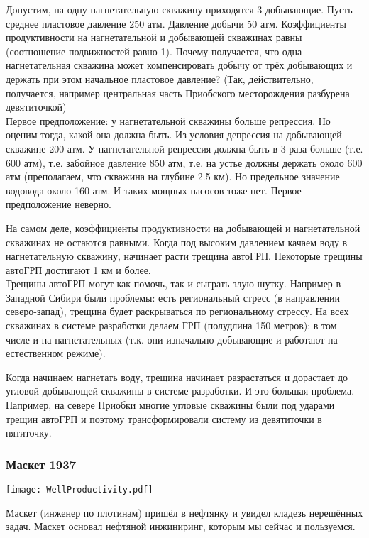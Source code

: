 \documentclass[main.tex]{subfiles}
\begin{document}
Допустим, на одну нагнетательную скважину приходятся 3 добывающие. Пусть среднее пластовое давление 250 атм. Давление добычи 50 атм. Коэффициенты продуктивности на нагнетательной и добывающей скважинах равны (соотношение подвижностей равно 1). Почему получается, что одна нагнетательная скважина может компенсировать добычу от трёх добывающих и держать при этом начальное пластовое давление? (Так, действительно, получается, например центральная часть Приобского месторождения разбурена девятиточкой)\\

Первое предположение: у нагнетательной скважины больше репрессия. Но оценим тогда, какой она должна быть. Из условия депрессия на добывающей скважине 200 атм. У нагнетательной репрессия должна быть в 3 раза больше (т.е. 600 атм), т.е. забойное давление 850 атм, т.е. на устье должны держать около 600 атм (преполагаем, что скважина на глубине 2.5 км).
Но предельное значение водовода около 160 атм. И таких мощных насосов тоже нет. Первое предположение неверно.

На самом деле, коэффициенты продуктивности на добывающей и нагнетательной скважинах не остаются равными. Когда под высоким давлением качаем воду в нагнетательную скважину, начинает расти трещина автоГРП. Некоторые трещины автоГРП достигают 1 км и более.\\

Трещины автоГРП могут как помочь, так и сыграть злую шутку.
Например в Западной Сибири были проблемы: есть региональный стресс (в направлении северо-запад), трещина будет раскрываться по региональному стрессу. На всех скважинах в системе разработки делаем ГРП (полудлина 150 метров): в том числе и на нагнетательных (т.к. они изначально добывающие и работают на естественном режиме).

Когда начинаем нагнетать воду, трещина начинает разрастаться и дорастает до угловой добывающей скважины в системе разработки. И это большая проблема. Например, на севере Приобки многие угловые скважины были под ударами трещин автоГРП и поэтому трансформировали систему из девятиточки в пятиточку.

\subsubsection{Маскет 1937}

\texttt{[image: WellProductivity.pdf]}

Маскет (инженер по плотинам) пришёл в нефтянку и увидел кладезь нерешённых задач. Маскет основал нефтяной инжиниринг, которым мы сейчас и пользуемся.\\
\end{document}
